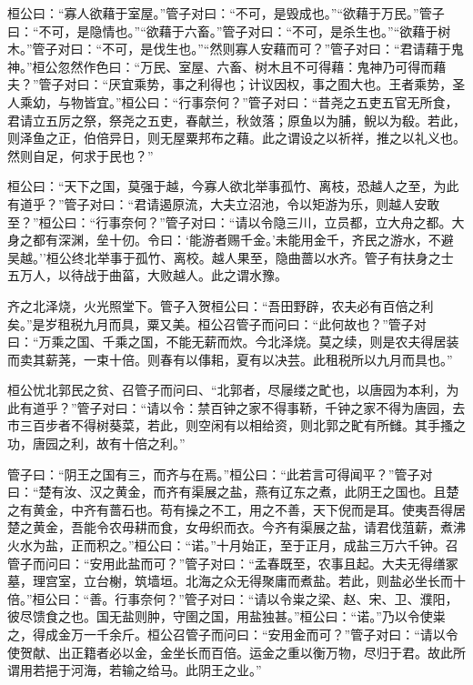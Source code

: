 \documentclass[]{article}
\begin{document}
桓公曰：``寡人欲藉于室屋。''管子对曰：``不可，是毁成也。''``欲藉于万民。''管子曰：``不可，是隐情也。''``欲藉于六畜。''管子对曰：``不可，是杀生也。''``欲藉于树木。''管子对曰：``不可，是伐生也。''``然则寡人安藉而可？''管子对曰：``君请藉于鬼神。''桓公忽然作色曰：``万民、室屋、六畜、树木且不可得藉：鬼神乃可得而藉夫？''管子对曰：``厌宜乘势，事之利得也；计议因权，事之囿大也。王者乘势，圣人乘幼，与物皆宜。''桓公曰：``行事奈何？''管子对曰：``昔尧之五吏五官无所食，君请立五厉之祭，祭尧之五吏，春献兰，秋敛落；原鱼以为脯，鲵以为殽。若此，则泽鱼之正，伯倍异日，则无屋粟邦布之藉。此之谓设之以祈祥，推之以礼义也。然则自足，何求于民也？''

桓公曰：``天下之国，莫强于越，今寡人欲北举事孤竹、离枝，恐越人之至，为此有道乎？''管子对曰：``君请遏原流，大夫立沼池，令以矩游为乐，则越人安敢至？''桓公曰：``行事奈何？''管子对曰：``请以令隐三川，立员都，立大舟之都。大身之都有深渊，垒十仞。令曰：`能游者赐千金。'未能用金千，齐民之游水，不避吴越。''桓公终北举事于孤竹、离校。越人果至，隐曲蔷以水齐。管子有扶身之士五万人，以待战于曲菑，大败越人。此之谓水豫。

齐之北泽烧，火光照堂下。管子入贺桓公曰：``吾田野辟，农夫必有百倍之利矣。''是岁租税九月而具，粟又美。桓公召管子而问曰：``此何故也？''管子对曰：``万乘之国、千乘之国，不能无薪而炊。今北泽烧。莫之续，则是农夫得居装而卖其薪荛，一束十倍。则春有以倳耜，夏有以决芸。此租税所以九月而具也。''

桓公忧北郭民之贫、召管子而问曰、``北郭者，尽屦缕之甿也，以唐园为本利，为此有道乎？''管子对曰：``请以令：禁百钟之家不得事鞒，千钟之家不得为唐园，去市三百步者不得树葵菜，若此，则空闲有以相给资，则北郭之甿有所雠。其手搔之功，唐园之利，故有十倍之利。''

管子曰：``阴王之国有三，而齐与在焉。''桓公曰：``此若言可得闻平？''管子对曰：``楚有汝、汉之黄金，而齐有渠展之盐，燕有辽东之煮，此阴王之国也。且楚之有黄金，中齐有蔷石也。苟有操之不工，用之不善，天下倪而是耳。使夷吾得居楚之黄金，吾能令农毋耕而食，女毋织而衣。今齐有渠展之盐，请君伐菹薪，煮沸火水为盐，正而积之。''桓公曰：``诺。''十月始正，至于正月，成盐三万六千钟。召管子而问曰：``安用此盐而可？''管子对曰：``孟春既至，农事且起。大夫无得缮冢墓，理宫室，立台榭，筑墙垣。北海之众无得聚庸而煮盐。若此，则盐必坐长而十倍。''桓公曰：``善。行事奈何？''管子对曰：``请以令粜之梁、赵、宋、卫、濮阳，彼尽馈食之也。国无盐则肿，守圉之国，用盐独甚。''桓公曰：``诺。''乃以令使粜之，得成金万一千余斤。桓公召管子而问曰：``安用金而可？''管子对曰：``请以令使贺献、出正籍者必以金，金坐长而百倍。运金之重以衡万物，尽归于君。故此所谓用若挹于河海，若输之给马。此阴王之业。''
\end{document}
